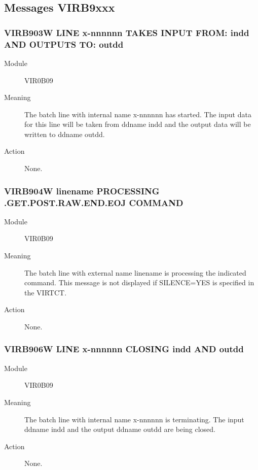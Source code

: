 \documentclass[letterpaper,10pt,english]{sphinxmanual}
\begin{document}
\subsection{Messages VIRB9xxx}
\label{\detokenize{messages:messages-virb9xxx}}

\subsubsection{VIRB903W LINE x-nnnnnn TAKES INPUT FROM: indd AND OUTPUTS TO: outdd}
\label{\detokenize{messages:virb903w-line-x-nnnnnn-takes-input-from-indd-and-outputs-to-outdd}}\begin{description}
\item[{Module}] \leavevmode
VIR0B09

\item[{Meaning}] \leavevmode
The batch line with internal name x-nnnnnn has started. The input data for this line will be taken from ddname indd and the output data will be written to ddname outdd.

\item[{Action}] \leavevmode
None.

\end{description}


\subsubsection{VIRB904W linename PROCESSING .GET\textbar{}.POST\textbar{}.RAW\textbar{}.END\textbar{}.EOJ COMMAND}
\label{\detokenize{messages:virb904w-linename-processing-get-post-raw-end-eoj-command}}\begin{description}
\item[{Module}] \leavevmode
VIR0B09

\item[{Meaning}] \leavevmode
The batch line with external name linename is processing the indicated command. This message is not displayed if SILENCE=YES is specified in the VIRTCT.

\item[{Action}] \leavevmode
None.

\end{description}


\subsubsection{VIRB906W LINE x-nnnnnn CLOSING indd AND outdd}
\label{\detokenize{messages:virb906w-line-x-nnnnnn-closing-indd-and-outdd}}\begin{description}
\item[{Module}] \leavevmode
VIR0B09

\item[{Meaning}] \leavevmode
The batch line with internal name x-nnnnnn is terminating. The input ddname indd and the output ddname outdd are being closed.

\item[{Action}] \leavevmode
None.

\end{description}
\end{document}
